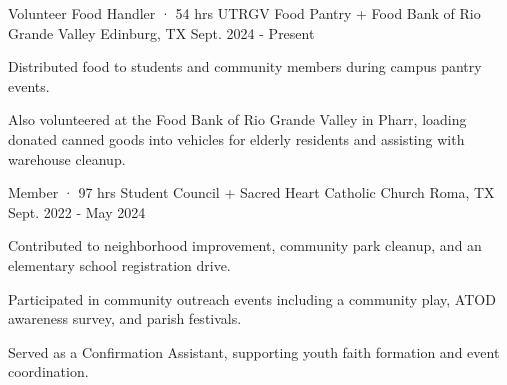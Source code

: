 

\begin{cventries}

  \cventry
    {Volunteer Food Handler · 54 hrs} %
    {UTRGV Food Pantry + Food Bank of Rio Grande Valley} %
    {Edinburg, TX} %
    {Sept. 2024 - Present} %
    {
      \begin{cvitems}
        \item {Distributed food to students and community members during campus pantry events.}
        \item {Also volunteered at the Food Bank of Rio Grande Valley in Pharr, loading donated canned goods into vehicles for elderly residents and assisting with warehouse cleanup.}
      \end{cvitems}
    }

  \cventry
    {Member · 97 hrs} %
    {Student Council + Sacred Heart Catholic Church} %
    {Roma, TX} %
    {Sept. 2022 - May 2024} %
    {
      \begin{cvitems}
        \item {Contributed to neighborhood improvement, community park cleanup, and an elementary school registration drive.}
        \item {Participated in community outreach events including a community play, ATOD awareness survey, and parish festivals.}
        \item {Served as a Confirmation Assistant, supporting youth faith formation and event coordination.}
      \end{cvitems}
    }

\end{cventries}
